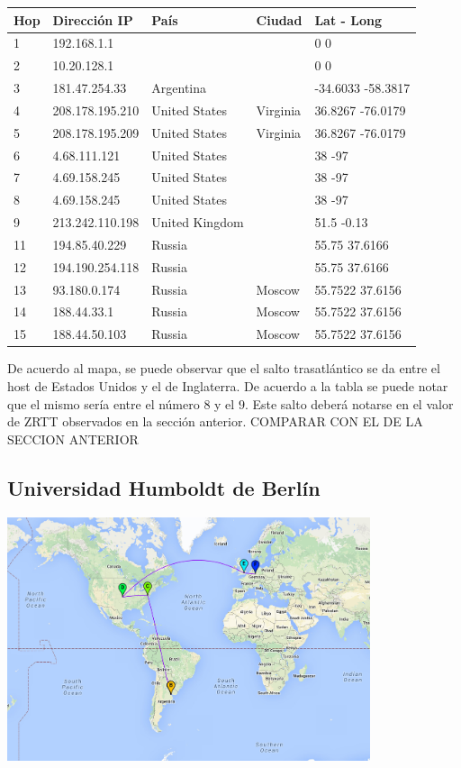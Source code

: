 \begin{center}
 \begin{tabular}{|l|l|l|l|l|}
    \hline
    Hop &Dirección IP &País &Ciudad &Lat - Long \\ \hline \hline
    1 & 192.168.1.1 &  &  & 0 0 \\ \hline
    2 & 10.20.128.1 &  &  & 0 0 \\ \hline
    3 & 181.47.254.33 & Argentina &  & -34.6033 -58.3817 \\ \hline
    4 & 208.178.195.210 & United States & Virginia & 36.8267 -76.0179 \\ \hline
    5 & 208.178.195.209 & United States & Virginia & 36.8267 -76.0179 \\ \hline
    6 & 4.68.111.121 & United States &  & 38 -97 \\ \hline
    7 & 4.69.158.245 & United States &  & 38 -97 \\ \hline
    8 & 4.69.158.245 & United States &  & 38 -97 \\ \hline
    9 & 213.242.110.198 & United Kingdom &  & 51.5 -0.13 \\ \hline
    11 & 194.85.40.229 & Russia &  & 55.75 37.6166 \\ \hline
    12 & 194.190.254.118 & Russia &  & 55.75 37.6166 \\ \hline
    13 & 93.180.0.174 & Russia & Moscow & 55.7522 37.6156 \\ \hline
    14 & 188.44.33.1 & Russia & Moscow & 55.7522 37.6156 \\ \hline
    15 & 188.44.50.103 & Russia & Moscow & 55.7522 37.6156 \\ \hline
 \end{tabular}
\end{center}

De acuerdo al mapa, se puede observar que el salto trasatlántico se da entre el host de Estados Unidos y el de Inglaterra. De acuerdo a la tabla se puede notar que el mismo sería entre el número $8$ y el $9$. Este salto deberá notarse en el valor de ZRTT observados en la sección anterior. COMPARAR CON EL DE LA SECCION ANTERIOR

\subsection{Universidad Humboldt de Berlín}
\centerline{\includegraphics[width=0.8\textwidth]{mapas/Alemania.jpeg}}

